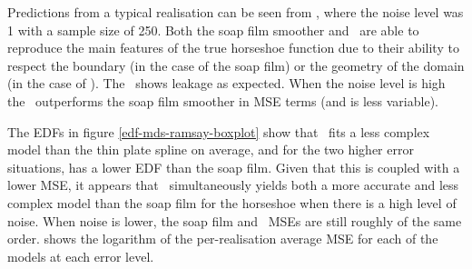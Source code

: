 Predictions from a typical realisation can be seen from , where the noise level was 1 with a sample size of 250. Both the soap film smoother and \mdsap\ are able to reproduce the main features of the true horseshoe function due to their ability to respect the boundary (in the case of the soap film) or the geometry of the domain (in the case of \mdsap). The \tprs\ shows leakage as expected. When the noise level is high the \mdsap\ outperforms the soap film smoother in MSE terms (and is less variable).


The EDFs in figure \ref{edf-mds-ramsay-boxplot} show that \mdsap\ fits a less complex model than the thin plate spline on average, and for the two higher error situations, has a lower EDF than the soap film. Given that this is coupled with a lower MSE, it appears that \mdsap\ simultaneously yields both a more accurate and less complex model than the soap film for the horseshoe when there is a high level of noise. When noise is lower, the soap film and \mdsap\ MSEs are still roughly of the same order.  shows the logarithm of the per-realisation average MSE for each of the models at each error level.

